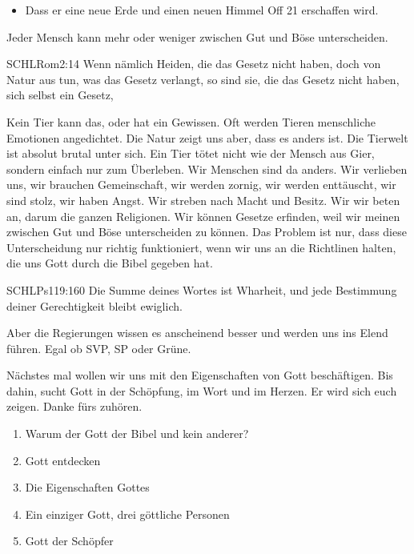 \begin{otsblock}
\begin{otsblock}
\begin{itemize}
            \item Dass er eine neue Erde und einen neuen Himmel Off 21 erschaffen wird.
        \end{itemize}       
        \end{otsblock}
        \begin{otsblock}
        Jeder Mensch kann mehr oder weniger zwischen Gut und Böse unterscheiden. 
        \begin{bibelbox}{SCHL}{Rom}{2:14}
        Wenn nämlich Heiden, die das Gesetz nicht haben, doch von Natur aus tun, was das Gesetz verlangt, so sind sie, die das Gesetz nicht haben, sich selbst ein Gesetz,
        \end{bibelbox}
        Kein Tier kann das, oder hat ein Gewissen. Oft werden Tieren menschliche Emotionen angedichtet. Die Natur zeigt uns aber, dass es anders ist. Die Tierwelt ist absolut brutal unter sich. Ein Tier tötet nicht wie der Mensch aus Gier, sondern einfach nur zum Überleben. Wir Menschen sind da anders. Wir verlieben uns, wir brauchen Gemeinschaft, wir werden zornig, wir werden enttäuscht, wir sind stolz, wir haben Angst. Wir streben nach Macht und Besitz. Wir wir beten an, darum die ganzen Religionen. Wir können Gesetze erfinden, weil wir meinen zwischen Gut und Böse unterscheiden zu können. Das Problem ist nur, dass diese Unterscheidung nur richtig funktioniert, wenn wir uns an die Richtlinen halten, die uns Gott durch die Bibel gegeben hat.
        \begin{bibelbox}{SCHL}{Ps}{119:160}
        Die Summe deines Wortes ist Wharheit, und jede Bestimmung deiner Gerechtigkeit bleibt ewiglich.
        \end{bibelbox}
        Aber die Regierungen wissen es anscheinend besser und werden uns ins Elend führen. Egal ob SVP, SP oder Grüne.

       \end{otsblock}

       Nächstes mal wollen wir uns mit den Eigenschaften von Gott beschäftigen. Bis dahin, sucht Gott in der Schöpfung, im Wort und im Herzen. Er wird sich euch zeigen. Danke fürs zuhören.
        \begin{enumerate}
            \item Warum der Gott der Bibel und kein anderer?
            \item Gott entdecken
            \item Die Eigenschaften Gottes
            \item Ein einziger Gott, drei göttliche Personen
            \item Gott der Schöpfer
        \end{enumerate}      
    
    \end{otsblock}